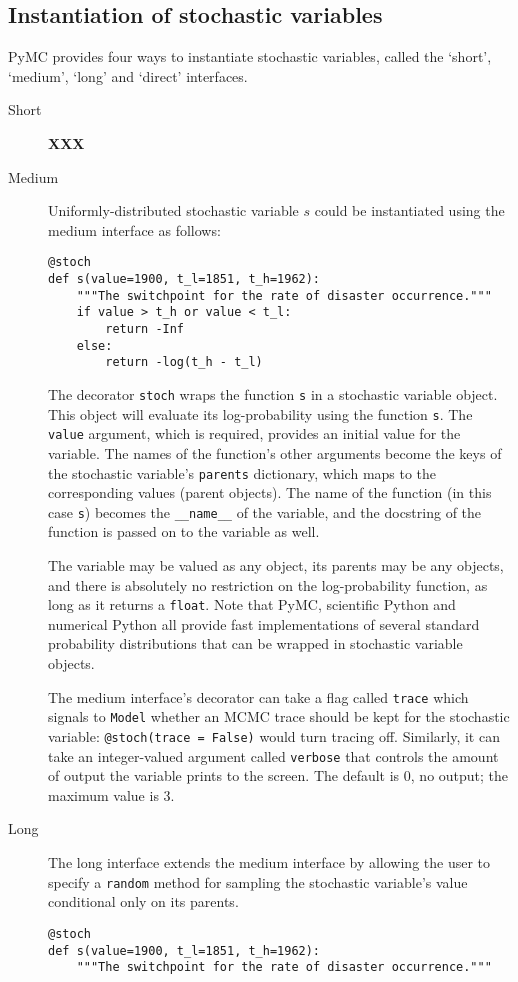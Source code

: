 \subsection{Instantiation of stochastic variables}
PyMC provides four ways to instantiate stochastic variables, called the `short', `medium', `long' and `direct' interfaces.
\begin{description}
    \item[Short] \textbf{XXX}
    \item[Medium] Uniformly-distributed stochastic variable $s$ could be instantiated using the medium interface as follows:
    \begin{verbatim}
@stoch
def s(value=1900, t_l=1851, t_h=1962):
    """The switchpoint for the rate of disaster occurrence."""
    if value > t_h or value < t_l:
        return -Inf
    else:
        return -log(t_h - t_l) 
    \end{verbatim}
    The decorator \texttt{stoch} wraps the function \texttt{s} in a stochastic variable object. This object will evaluate its log-probability using the function \texttt{s}. The \texttt{value} argument, which is required, provides an initial value for the variable. The names of the function's other arguments become the keys of the stochastic variable's \texttt{parents} dictionary, which maps to the corresponding values (parent objects). The name of the function (in this case \texttt{s}) becomes the \texttt{\_\_name\_\_} of the variable, and the docstring of the function is passed on to the variable as well.

The variable may be valued as any object, its parents may be any objects, and there is absolutely no restriction on the log-probability function, as long as it returns a \texttt{float}. Note that PyMC, scientific Python and numerical Python all provide fast implementations of several standard probability distributions that can be wrapped in stochastic variable objects.

    The medium interface's decorator can take a flag called \texttt{trace} which signals to \texttt{Model} whether an MCMC trace should be kept for the stochastic variable: \texttt{@stoch(trace = False)} would turn tracing off. Similarly, it can take an integer-valued argument called \texttt{verbose} that controls the amount of output the variable prints to the screen. The default is $0$, no output; the maximum value is 3.

    \item[Long] The long interface extends the medium interface by allowing the user to specify a \texttt{random} method for sampling the stochastic variable's value conditional only on its parents.
    \begin{verbatim}
@stoch
def s(value=1900, t_l=1851, t_h=1962):
    """The switchpoint for the rate of disaster occurrence."""


\end{verbatim}
\end{description}
